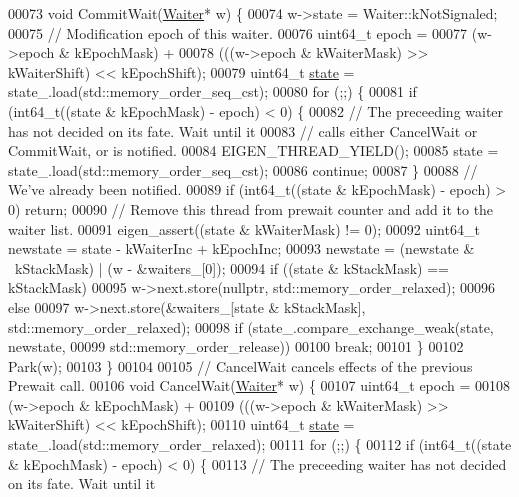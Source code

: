 \begin{DoxyCode}
{00073   \textcolor{keywordtype}{void} CommitWait(\hyperlink{class_eigen_1_1_event_count_1_1_waiter}{Waiter}* w) \{
00074     w->state = Waiter::kNotSignaled;
00075     \textcolor{comment}{// Modification epoch of this waiter.}
00076     uint64\_t epoch =
00077         (w->epoch & kEpochMask) +
00078         (((w->epoch & kWaiterMask) >> kWaiterShift) << kEpochShift);
00079     uint64\_t \hyperlink{structstate}{state} = state\_.load(std::memory\_order\_seq\_cst);
00080     \textcolor{keywordflow}{for} (;;) \{
00081       \textcolor{keywordflow}{if} (int64\_t((state & kEpochMask) - epoch) < 0) \{
00082         \textcolor{comment}{// The preceeding waiter has not decided on its fate. Wait until it}
00083         \textcolor{comment}{// calls either CancelWait or CommitWait, or is notified.}
00084         EIGEN\_THREAD\_YIELD();
00085         state = state\_.load(std::memory\_order\_seq\_cst);
00086         \textcolor{keywordflow}{continue};
00087       \}
00088       \textcolor{comment}{// We've already been notified.}
00089       \textcolor{keywordflow}{if} (int64\_t((state & kEpochMask) - epoch) > 0) \textcolor{keywordflow}{return};
00090       \textcolor{comment}{// Remove this thread from prewait counter and add it to the waiter list.}
00091       eigen\_assert((state & kWaiterMask) != 0);
00092       uint64\_t newstate = state - kWaiterInc + kEpochInc;
00093       newstate = (newstate & ~kStackMask) | (w - &waiters\_[0]);
00094       \textcolor{keywordflow}{if} ((state & kStackMask) == kStackMask)
00095         w->next.store(\textcolor{keyword}{nullptr}, std::memory\_order\_relaxed);
00096       \textcolor{keywordflow}{else}
00097         w->next.store(&waiters\_[state & kStackMask], std::memory\_order\_relaxed);
00098       \textcolor{keywordflow}{if} (state\_.compare\_exchange\_weak(state, newstate,
00099                                        std::memory\_order\_release))
00100         \textcolor{keywordflow}{break};
00101     \}
00102     Park(w);
00103   \}
00104 
00105   \textcolor{comment}{// CancelWait cancels effects of the previous Prewait call.}
00106   \textcolor{keywordtype}{void} CancelWait(\hyperlink{class_eigen_1_1_event_count_1_1_waiter}{Waiter}* w) \{
00107     uint64\_t epoch =
00108         (w->epoch & kEpochMask) +
00109         (((w->epoch & kWaiterMask) >> kWaiterShift) << kEpochShift);
00110     uint64\_t \hyperlink{structstate}{state} = state\_.load(std::memory\_order\_relaxed);
00111     \textcolor{keywordflow}{for} (;;) \{
00112       \textcolor{keywordflow}{if} (int64\_t((state & kEpochMask) - epoch) < 0) \{
00113         \textcolor{comment}{// The preceeding waiter has not decided on its fate. Wait until it}
}
\end{DoxyCode}
